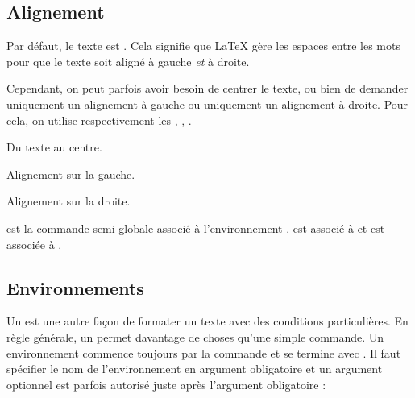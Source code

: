 \subsection{Alignement}

Par défaut, le texte est . Cela signifie que \LaTeX{} gère les espaces entre les mots pour que le texte soit aligné à gauche \textit{et} à droite.\par
Cependant, on peut parfois avoir besoin de centrer le texte, ou bien de demander uniquement un alignement à gauche ou uniquement un alignement à droite. Pour cela, on utilise respectivement les  , , .

{\NewFont
\begin{SideBySideExample}
    \begin{center}
    Du texte au centre.
    \end{center}
    \begin{flushleft}
    Alignement sur la gauche.
    \end{flushleft}
    \begin{flushright}
    Alignement sur la droite.
    \end{flushright}
\end{SideBySideExample}
}

\begin{info}
     est la commande semi-globale associé à l'environnement .  est associé à  et  est associée à .
\end{info}

\subsection{Environnements}

Un  est une autre façon de formater un texte avec des conditions particulières. En règle générale, un  permet davantage de choses qu'une simple commande. Un environnement commence toujours par la commande  et se termine avec . Il faut spécifier le nom de l'environnement en argument obligatoire et un argument optionnel est parfois autorisé juste après l'argument obligatoire :
\begin{center}
    \par
    \quad {}\par
\end{center}


